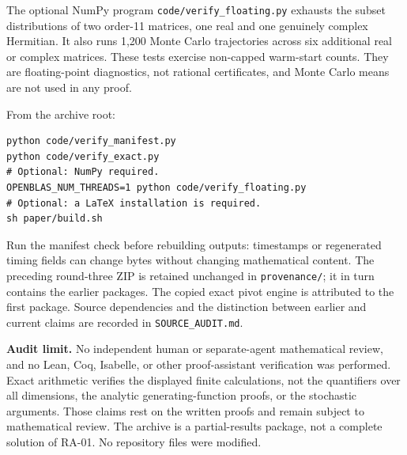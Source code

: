 \documentclass[11pt]{article}
\theoremstyle{remark}\newtheorem{remark}[theorem]{Remark}
\begin{document}
The optional NumPy program \texttt{code/verify\_floating.py} exhausts the subset distributions of two order-11 matrices, one real and one genuinely complex Hermitian. It also runs 1,200 Monte Carlo trajectories across six additional real or complex matrices. These tests exercise non-capped warm-start counts. They are floating-point diagnostics, not rational certificates, and Monte Carlo means are not used in any proof.

From the archive root:
\begin{verbatim}
python code/verify_manifest.py
python code/verify_exact.py
# Optional: NumPy required.
OPENBLAS_NUM_THREADS=1 python code/verify_floating.py
# Optional: a LaTeX installation is required.
sh paper/build.sh
\end{verbatim}

Run the manifest check before rebuilding outputs: timestamps or regenerated timing fields can change bytes without changing mathematical content. The preceding round-three ZIP is retained unchanged in \texttt{provenance/}; it in turn contains the earlier packages. The copied exact pivot engine is attributed to the first package. Source dependencies and the distinction between earlier and current claims are recorded in \texttt{SOURCE\_AUDIT.md}.

\textbf{Audit limit.} No independent human or separate-agent mathematical review, and no Lean, Coq, Isabelle, or other proof-assistant verification was performed. Exact arithmetic verifies the displayed finite calculations, not the quantifiers over all dimensions, the analytic generating-function proofs, or the stochastic arguments. Those claims rest on the written proofs and remain subject to mathematical review. The archive is a partial-results package, not a complete solution of RA-01. No repository files were modified.
\end{document}
